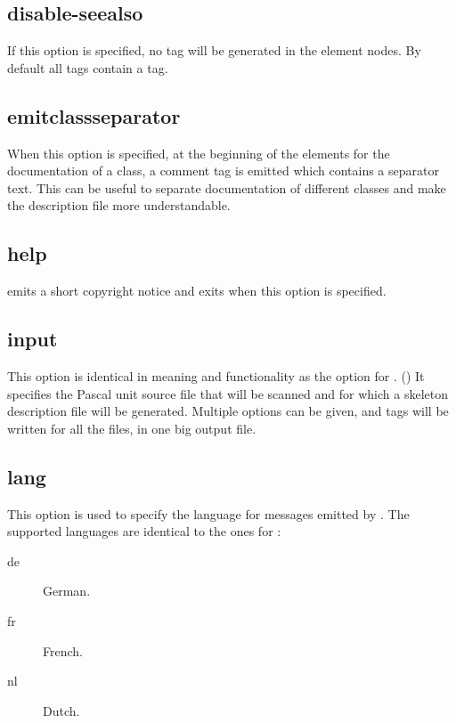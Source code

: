 \subsection{disable-seealso}
\label{suse:msdisableseealso}
If this option is specified, no  tag will be generated in the
element nodes. By default all  tags contain a  tag.


\subsection{emitclassseparator}
\label{suse:msemitclassseparator}
When this option is specified, at the beginning of the elements for the
documentation of a class, a comment tag is emitted which contains a
separator text. This can be useful to separate documentation of different
classes and make the description file more understandable.

\subsection{help}
\label{suse:mshelp}
 emits a short copyright notice and exits when this option is
specified.

\subsection{input}
\label{suse:msinput}
This option is identical in meaning and functionality as the 
option for \fpdoc. () It specifies the Pascal unit source 
file that will be scanned and for which a skeleton description file will be
generated. Multiple  options can be given, and 
tags will be written for all the files, in one big output file.

\subsection{lang}
\label{suse:mslang}
This option is used to specify the language for messages emitted by
. The supported languages are identical to the ones 
for \fpdoc:
\begin{description}
\item[de] German.
\item[fr] French.
\item[nl] Dutch.
\end{description}


